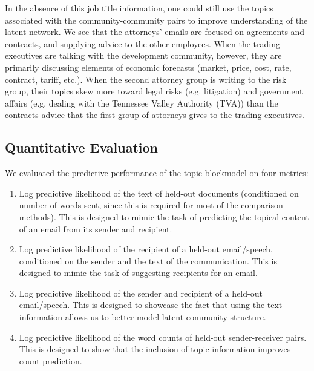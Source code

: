         In the absence of this job title information, one could still use the topics associated with the community-community pairs to improve understanding of the latent network. We see that  the attorneys' emails are focused on agreements and contracts, and supplying advice to the other employees. When the trading executives are talking with the development community, however, they are primarily discussing elements of economic forecasts (market, price, cost, rate, contract, tariff, etc.).  When the second attorney group is writing to the risk group, their topics skew more toward legal risks (e.g. litigation) and government affairs (e.g. dealing with the Tennessee Valley Authority (TVA)) than the contracts advice that the first group of attorneys gives to the trading executives.
    
    \subsection{Quantitative Evaluation}\label{sec:quant}
        We evaluated the predictive performance of the topic blockmodel on four metrics:
        \begin{enumerate}
            \item Log predictive likelihood of the text of held-out documents (conditioned on number of words sent, since this is required for most of the comparison methods). This is designed to mimic the task of predicting the topical content of an email from its sender and recipient.
            \item Log predictive likelihood of the recipient of a held-out email/speech, conditioned on the sender and the text of the communication. This is designed to mimic the task of suggesting recipients for an email.
            \item Log predictive likelihood of the sender and recipient of a held-out email/speech. This is designed to showcase the fact that using the text information allows us to better model latent community structure. 
            \item Log predictive likelihood of the word counts of held-out sender-receiver pairs. This is designed to show that the inclusion of topic information improves count prediction.
        \end{enumerate}
        
